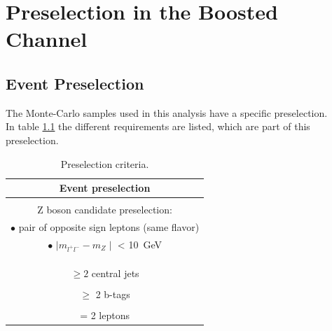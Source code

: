 
\chapter{Preselection in the Boosted Channel}

\section{Event Preselection}
\label{Event Preselection}
The Monte-Carlo samples used in this analysis have a specific preselection.\\
In table \ref{Event preselection} the different requirements are listed, which are part of this preselection. 

\vspace{0.5cm}

\begin{table}
\centering
\setlength{\tabcolsep}{3cm}
\begin{tabular}{|c|} 
\hline
\textbf{Event preselection} \\
\hline
\hline
\vspace{-0.3cm}
\\
Z boson candidate preselection:\\
\vspace{-0.1cm}
\footnotesize{$\bullet$ pair of opposite sign leptons (same flavor)} \\

\footnotesize{$\bullet$ $\mid m_{l^{+} l^{-}} - m_{Z} \mid$ < \SI{10}{GeV}} \\
\\
\vspace{-0.9cm}
\\
\hline
\vspace{-0.3cm}
\\
$\geq 2$ central jets \\
\vspace{-0.4cm}
\\
$\geq$ 2 b-tags\\
\vspace{-0.4cm}
\\
= 2 leptons \\
\hline
\end{tabular}
\caption{Preselection criteria.}
\label{Event preselection}
\end{table}


